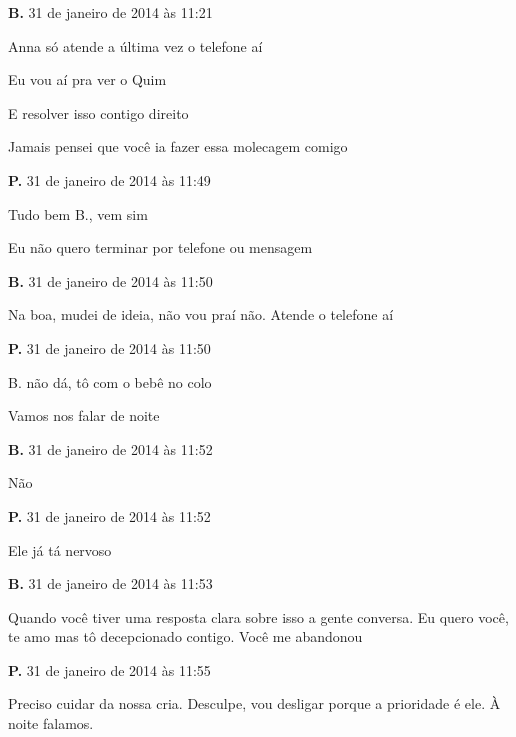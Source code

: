 \begin{flushleft}
\parindent0pt\parskip1pt\raggedright
\textbf{B.} 31 de janeiro de 2014 às 11:21

Anna só atende a última vez o telefone aí

Eu vou aí pra ver o Quim

E resolver isso contigo direito

Jamais pensei que você ia fazer essa molecagem comigo

\textbf{P.} 31 de janeiro de 2014 às 11:49

Tudo bem B., vem sim

Eu não quero terminar por telefone ou mensagem

\textbf{B.} 31 de janeiro de 2014 às 11:50

Na boa, mudei de ideia, não vou praí não. Atende o telefone aí

\textbf{P.} 31 de janeiro de 2014 às 11:50

B. não dá, tô com o bebê no colo

Vamos nos falar de noite

\textbf{B.} 31 de janeiro de 2014 às 11:52

Não

\textbf{P.} 31 de janeiro de 2014 às 11:52

Ele já tá nervoso

\textbf{B.} 31 de janeiro de 2014 às 11:53

Quando você tiver uma resposta clara sobre isso a gente conversa. Eu
quero você, te amo mas tô decepcionado contigo. Você me abandonou

\textbf{P.} 31 de janeiro de 2014 às 11:55

Preciso cuidar da nossa cria. Desculpe, vou desligar porque a prioridade
é ele. À noite falamos.


\end{flushleft}
